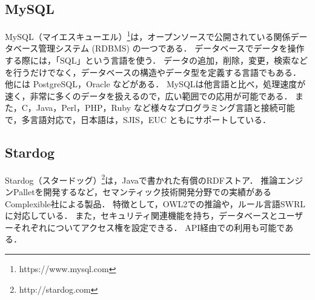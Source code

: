 \subsection{MySQL}
MySQL（マイエスキューエル）\footnote{https://www.mysql.com}は，オープンソースで公開されている関係データベース管理システム (RDBMS) の一つである．
データベースでデータを操作する際には，「SQL」という言語を使う．
データの追加，削除，変更，検索などを行うだけでなく，データベースの構造やデータ型を定義する言語でもある．
他には PostgreSQL，Oracle などがある．
MySQLは他言語と比べ，処理速度が速く，非常に多くのデータを扱えるので，広い範囲での応用が可能である．
また，C，Java，Perl，PHP，Ruby など様々なプログラミング言語と接続可能で，多言語対応で，日本語は，SJIS，EUC ともにサポートしている．

\subsection{Stardog}
Stardog（スタードッグ）\footnote{http://stardog.com}は，Javaで書かれた有償のRDFストア．
推論エンジンPalletを開発するなど，セマンティック技術開発分野での実績があるComplexible社による製品．
特徴として，OWL2での推論や，ルール言語SWRLに対応している．
また，セキュリティ関連機能を持ち，データベースとユーザーそれぞれについてアクセス権を設定できる．
API経由での利用も可能である．
